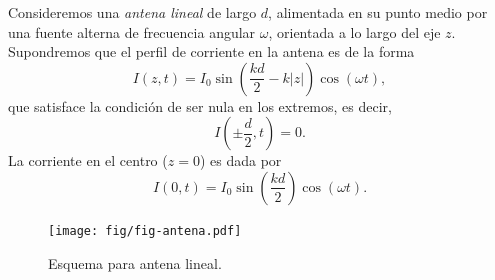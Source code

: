 Consideremos una \textit{antena lineal} de largo $d$, alimentada en su punto medio por una fuente alterna de frecuencia angular $\omega$, orientada a lo largo del eje $z$. Supondremos que el perfil de corriente en la antena es de la forma
\begin{equation}
 I(z,t)=I_0\sin\left(\frac{kd}{2}-k|z|\right)\cos(\omega t),
\end{equation}
que satisface la condición de ser nula en los extremos, es decir,
\begin{equation}
 I\left(\pm \frac{d}{2},t\right)=0.
\end{equation}
La corriente en el centro ($z=0$) es dada por
\begin{equation}
 I(0,t)=I_0\sin\left(\frac{kd}{2}\right)\cos(\omega t).
\end{equation}

\begin{figure}[H]
\centerline{\texttt{[image: fig/fig-antena.pdf]}}
 \caption{Esquema para antena lineal.}
\label{fig:antena}
\end{figure}

